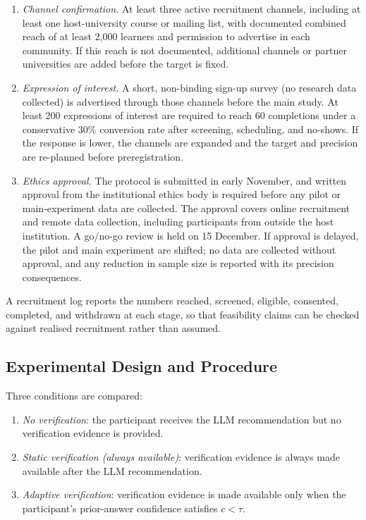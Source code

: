 \documentclass[oneside,final,14pt,a4paper]{extreport}
\begin{document}
\begin{enumerate}
\item \emph{Channel confirmation.} At least three active recruitment channels,
including at least one host-university course or mailing list, with documented
combined reach of at least 2,000 learners and permission to advertise in each
community. If this reach is not documented, additional channels or partner
universities are added before the target is fixed.
\item \emph{Expression of interest.} A short, non-binding sign-up survey (no
research data collected) is advertised through those channels before the main
study. At least 200 expressions of interest are required to reach 60 completions
under a conservative 30\% conversion rate after screening, scheduling, and
no-shows. If the response is lower, the channels are expanded and the target and
precision are re-planned before preregistration.
\item \emph{Ethics approval.} The protocol is submitted in early November, and
written approval from the institutional ethics body is required before any pilot
or main-experiment data are collected. The approval covers online recruitment
and remote data collection, including participants from outside the host
institution. A go/no-go review is held on 15 December. If approval is delayed,
the pilot and main experiment are shifted; no data are collected without
approval, and any reduction in sample size is reported with its precision
consequences.
\end{enumerate}

A recruitment log reports the numbers reached, screened, eligible, consented,
completed, and withdrawn at each stage, so that feasibility claims can be
checked against realised recruitment rather than assumed.

\subsection{Experimental Design and Procedure}
\label{subsec:procedure}
Three conditions are compared:

\begin{enumerate}
\item \emph{No verification}: the participant receives the LLM recommendation
but no verification evidence is provided.
\item \emph{Static verification (always available)}: verification evidence is
always made available after the LLM recommendation.
\item \emph{Adaptive verification}: verification evidence is made available
only when the participant's prior-answer confidence satisfies $c<\tau$.
\end{enumerate}
\end{document}
